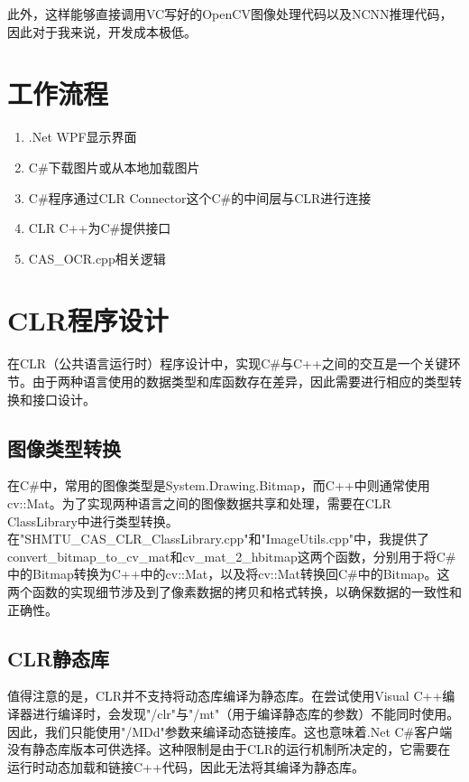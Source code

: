 此外，这样能够直接调用VC写好的OpenCV图像处理代码以及NCNN推理代码，因此对于我来说，开发成本极低。

\section{工作流程}

\begin{enumerate}
	\item .Net WPF显示界面
	\item C\#下载图片或从本地加载图片
	\item C\#程序通过CLR Connector这个C\#的中间层与CLR进行连接
	\item CLR C++为C\#提供接口
	\item CAS\_OCR.cpp相关逻辑
\end{enumerate}

\section{CLR程序设计}

在CLR（公共语言运行时）程序设计中，实现C\#与C++之间的交互是一个关键环节。由于两种语言使用的数据类型和库函数存在差异，因此需要进行相应的类型转换和接口设计。

\subsection{图像类型转换}

在C\#中，常用的图像类型是System.Drawing.Bitmap，而C++中则通常使用cv::Mat。为了实现两种语言之间的图像数据共享和处理，需要在CLR ClassLibrary中进行类型转换。在"SHMTU\_CAS\_CLR\_ClassLibrary.cpp"和"ImageUtils.cpp"中，我提供了convert\_bitmap\_to\_cv\_mat和cv\_mat\_2\_hbitmap这两个函数，分别用于将C\#中的Bitmap转换为C++中的cv::Mat，以及将cv::Mat转换回C\#中的Bitmap。这两个函数的实现细节涉及到了像素数据的拷贝和格式转换，以确保数据的一致性和正确性。

\subsection{CLR静态库}

值得注意的是，CLR并不支持将动态库编译为静态库。在尝试使用Visual C++编译器进行编译时，会发现"/clr"与"/mt"（用于编译静态库的参数）不能同时使用。因此，我们只能使用"/MDd"参数来编译动态链接库。这也意味着.Net C\#客户端没有静态库版本可供选择。这种限制是由于CLR的运行机制所决定的，它需要在运行时动态加载和链接C++代码，因此无法将其编译为静态库。


